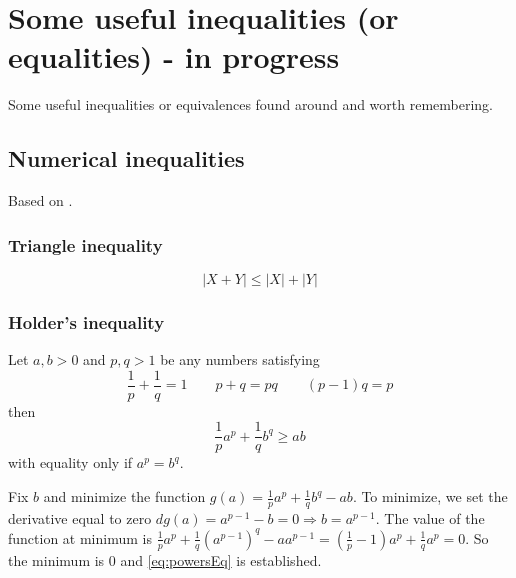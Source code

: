 
\clearpage

\section{Some useful inequalities (or equalities) - in progress}\label{sec:Inequalities}

Some useful inequalities or equivalences found around and worth remembering.


\subsection{Numerical inequalities}\label{sec:NumericalIneq}

Based on \cite{Casella2002}.

\subsubsection{Triangle inequality}
\begin{equation}\label{eq:Triangle}
|X+Y| \leq |X| + |Y|
\end{equation}

\subsubsection{Holder's inequality}\label{sec:Holder}

Let $a, b > 0$ and $p, q > 1$ be any numbers satisfying
\begin{equation}\label{eq:pqPowers}
\frac{1}{p} + \frac{1}{q} = 1 \qquad p+q = pq \qquad (p-1)q = p
\end{equation}
then
\begin{equation}\label{eq:powersEq}
\frac{1}{p}a^p + \frac{1}{q}b^q \geq ab
\end{equation}
with equality only if $a^p = b^q$.

\begin{prf}
Fix $b$ and minimize the function $g(a) = \frac{1}{p}a^p + \frac{1}{q}b^q - ab$.
To minimize, we set the derivative equal to zero $d g(a) = a^{p-1} - b = 0 \Rightarrow b = a^{p-1}$. 
The value of the function at minimum is 
$\frac{1}{p}a^p + \frac{1}{q}(a^{p-1})^q - aa^{p-1} = (\frac{1}{p}-1)a^p + \frac{1}{q}a^p = 0$.
So the minimum is $0$ and \eqref{eq:powersEq} is established.
\end{prf}

